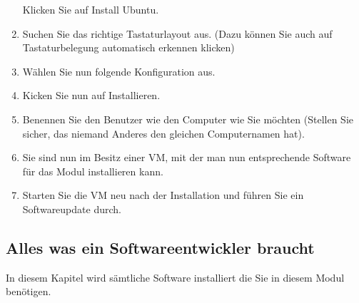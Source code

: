 \begin{frame}[fragile]
\begin{enumerate}
        Klicken Sie auf Install Ubuntu.
        \item Suchen Sie das richtige Tastaturlayout aus. (Dazu können Sie auch auf Tastaturbelegung automatisch erkennen klicken) \newpage
        \item Wählen Sie nun folgende Konfiguration aus.
        \item Kicken Sie nun auf Installieren.
        \item Benennen Sie den Benutzer wie den Computer wie Sie möchten (Stellen Sie sicher, das niemand Anderes den gleichen Computernamen hat).
        \item Sie sind nun im Besitz einer VM, mit der man nun entsprechende Software für das Modul installieren kann.
        \item Starten Sie die VM neu nach der Installation und führen Sie ein Softwareupdate durch.
    \end{enumerate}
\end{frame}

\subsection{Alles was ein Softwareentwickler braucht}\label{subsec:software}
\begin{frame}[fragile]
    In diesem Kapitel wird sämtliche Software installiert die Sie in diesem Modul benötigen.
\end{frame}
